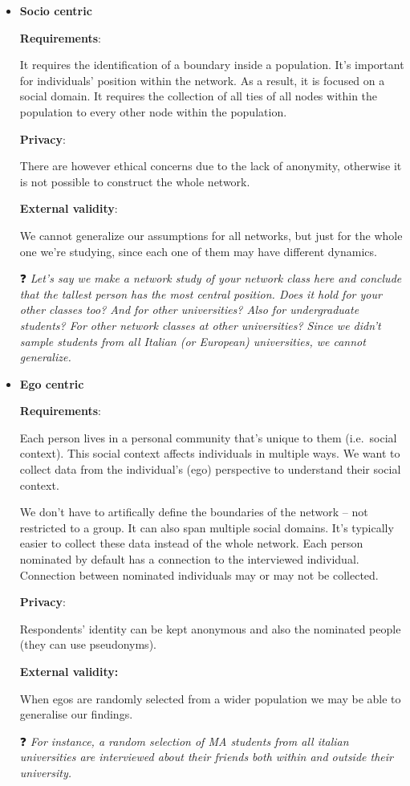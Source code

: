 \documentclass[
  notitlepage,
  onecolumn,
  openany]{book}
\begin{document}
\begin{itemize}
\item
  \textbf{Socio centric}

  \textbf{Requirements}:

  It requires the identification of a boundary inside a population. It's important for individuals' position within the network. As a result, it is focused on a social domain. It requires the collection of all ties of all nodes within the population to every other node within the population.

  \textbf{Privacy}:

  There are however ethical concerns due to the lack of anonymity, otherwise it is not possible to construct the whole network.

  \textbf{External validity}:

  We cannot generalize our assumptions for all networks, but just for the whole one we're studying, since each one of them may have different dynamics.

  ❓ \emph{Let's say we make a network study of your network class here and conclude that the tallest person has the most central position. Does it hold for your other classes too? And for other universities? Also for undergraduate students? For other network classes at other universities? Since we didn't sample students from all Italian (or European) universities, we cannot generalize.}
\item
  \textbf{Ego centric}

  \textbf{Requirements}:

  Each person lives in a personal community that's unique to them (i.e.~social context). This social context affects individuals in multiple ways. We want to collect data from the individual's (ego) perspective to understand their social context.

  We don't have to artifically define the boundaries of the network -- not restricted to a group. It can also span multiple social domains. It's typically easier to collect these data instead of the whole network. Each person nominated by default has a connection to the interviewed individual. Connection between nominated individuals may or may not be collected.

  \textbf{Privacy}:

  Respondents' identity can be kept anonymous and also the nominated people (they can use pseudonyms).

  \textbf{External validity:}

  When egos are randomly selected from a wider population we may be able to generalise our findings.

  ❓ \emph{For instance, a random selection of MA students from all italian universities are interviewed about their friends both within and outside their university.}
\end{itemize}
\end{document}
